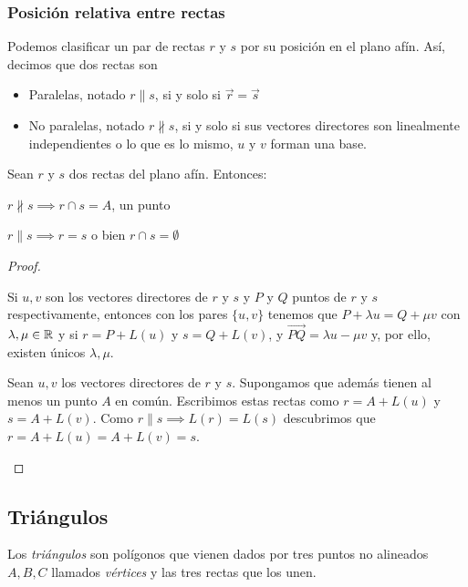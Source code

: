\subsubsection{Posición relativa entre rectas}

Podemos clasificar un par de rectas $r$ y $s$ por su posición en el plano afín. Así, decimos que dos rectas son

\begin{itemize}
\item Paralelas, notado $r\parallel s$, si y solo si $\vec{r} = \vec{s}$
\item No paralelas, notado $r\nparallel s$, si y solo si sus vectores directores son linealmente independientes o lo que es lo mismo, $u$ y $v$ forman una base.
\end{itemize}

\begin{nth}
  Sean $r$ y $s$ dos rectas del plano afín. Entonces:
  \begin{nlist}
  \item $r \nparallel s\implies r \cap s = A$, un punto
  \item $r \parallel s \implies r = s$ o bien $r \cap s =  \emptyset$
  \end{nlist}
\end{nth}
  \begin{proof}\hfill\\
    \begin{nlist}
    \item Si $u,v$ son los vectores directores de $r$ y $s$ y $P$ y $Q$ puntos de $r$ y $s$ respectivamente, entonces con los pares $\{u,v\}$ tenemos que $P+\lambda u = Q + \mu v$ con $\lambda, \mu \in \mathbb{R}$
      y si $r = P +L(u)$ y $s=Q+L(v)$, y $\overrightarrow{PQ} = \lambda u - \mu v $ y, por ello, existen únicos $\lambda, \mu$.
    \item Sean $u,v$ los vectores directores de $r$ y $s$. Supongamos que además tienen al menos un punto $A$ en común. Escribimos estas rectas como $r = A +L(u)$ y $s=A+L(v)$. Como $r \parallel s \implies L(r)=L(s)$ descubrimos que $r = A +L(u)=A+L(v) = s$.
    \end{nlist}
  \end{proof}


\subsection{Triángulos}
Los \textit{triángulos} son polígonos que vienen dados por tres puntos no alineados $A, B, C$ llamados \textit{vértices} y las tres rectas que los unen.

